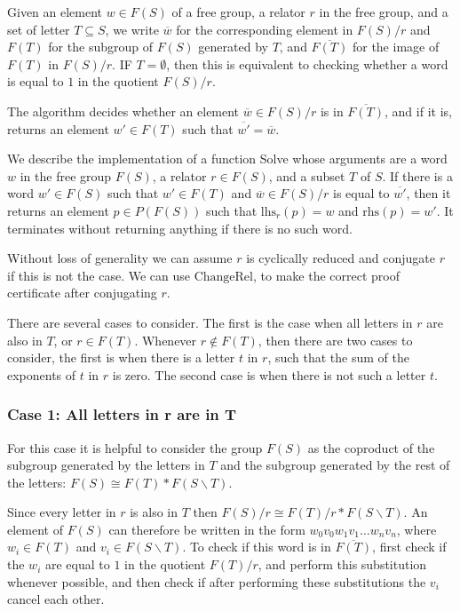 \documentclass[12pt]{article} %
\theoremstyle{definition}
\theoremstyle{definition}
\theoremstyle{definition}
\theoremstyle{definition}
\theoremstyle{definition}
\theoremstyle{definition}
\begin{document}
Given an element $w \in F(S)$ of a free group,
a relator $r$ in the free group, and a set of letter $T \subseteq S$,
we write $\overline {w}$ for the corresponding element in $F(S) / r$
and $F(T)$ for the subgroup of $F(S)$ generated by $T$,
and $\overline{F(T)}$ for the image of $F(T)$ in $F(S)/r$. IF $T = \emptyset$,
then this is equivalent to checking whether a word is equal to $1$ in the quotient
$F(S) / r$.

The algorithm decides whether an element $\overline{w} \in F(S) / r$ is in $\overline{F(T)}$,
and if it is, returns an element $w' \in F(T)$ such that $\overline{w'} = \overline{w}$.

We describe the implementation of a function Solve whose arguments are a word $w$
in the free group $F(S)$, a relator $r \in F(S)$,
and a subset $T$ of $S$. If there is a word $w' \in F(S)$
such that $w' \in F(T)$ and $\overline{w} \in F(S) / r$ is
equal to $\overline{w'}$, then it returns an element $p \in P(F(S))$
such that $\text{lhs}_r(p) = w$ and $\text{rhs}(p) = w'$. It terminates
without returning anything if there is no such word.

Without loss of generality we can assume $r$ is cyclically reduced and
conjugate $r$ if this is not the case. We can use $\text{ChangeRel}$,
to make the correct proof certificate after conjugating $r$.

There are several cases to consider. The first is the case when all letters in $r$
are also in $T$, or $r \in F(T)$. Whenever $r \notin F(T)$, then there are two
cases to consider, the first is when there is a letter $t$ in $r$, such that
the sum of the exponents of $t$ in $r$ is zero.
The second case is when there is not such a letter $t$.

\subsubsection{Case 1: All letters in r are in T}\label{allinT}
For this case it is helpful to consider the group $F(S)$ as the
coproduct of the subgroup generated by the letters in $T$ and
the subgroup generated by the rest of the letters:
$F(S) \cong F(T) \ast F(S \backslash T)$.

Since every letter in $r$ is also in $T$ then $F(S) / r \cong F(T) / r \ast F(S \backslash T)$.
An element of $F(S)$ can therefore be written in the form
$w_0v_0w_1v_1 \dots w_nv_n$, where $w_i \in F(T)$ and $v_i \in F(S \backslash T)$.
To check if this word is in $\overline{F(T)}$, first check if the $w_i$ are equal
to $1$ in the quotient $F(T) / r$, and perform this substitution whenever possible,
and then check if after performing these substitutions the $v_i$ cancel each other.
\end{document}
